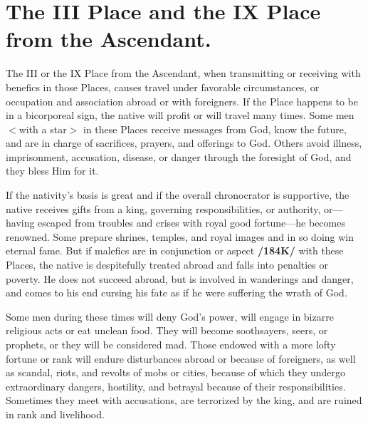 \section{The III Place and the IX Place from the Ascendant.}

The III or the IX Place from the Ascendant, when transmitting or receiving with benefics in those Places, causes travel under favorable circumstances, or occupation and association abroad or with foreigners. If the Place happens to be in a bicorporeal sign, the native will profit or will travel many times. Some men $<$with a star$>$ in these Places receive messages from God, know the future, and are in charge of sacrifices, prayers, and offerings to God. Others avoid illness, imprisonment, accusation, disease, or danger through the foresight of God, and they bless Him for it. 

If the nativity’s basis is great and if the overall chronocrator is supportive, the native receives gifts from a king, governing responsibilities, or authority, or—having escaped from troubles and crises with royal good fortune—he becomes renowned. Some prepare shrines, temples, and royal images and in so doing win eternal fame. But if malefics are in conjunction or aspect \textbf{/184K/} with these Places, the native is despitefully treated abroad and falls into penalties or poverty. He does not succeed abroad, but is involved in wanderings and danger, and comes to his end cursing his fate as if he were suffering the wrath of God. 

Some men during these times will deny God’s power, will engage in bizarre religious acts or eat unclean food. They will become soothsayers, seers, or prophets, or they will be considered mad. Those endowed with a more lofty fortune or rank will endure disturbances abroad or because of foreigners, as well as scandal, riots, and revolts of mobs or cities, because of which they undergo extraordinary dangers, hostility, and betrayal
because of their responsibilities. Sometimes they meet with accusations, are terrorized by the king, and are ruined in rank and livelihood.

\newpage